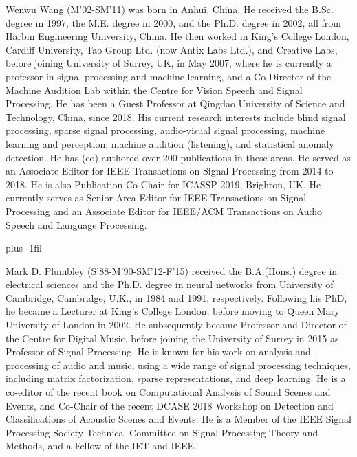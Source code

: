 \documentclass[journal]{IEEEtran}
\begin{document}
\begin{IEEEbiography}{Wenwu Wang} (M'02-SM'11) was born in Anhui, China. He received the B.Sc. degree in 1997, the M.E. degree in 2000, and the Ph.D. degree in 2002, all from Harbin Engineering University, China. He then worked in King's College London, Cardiff University, Tao Group Ltd. (now Antix Labs Ltd.), and Creative Labs, before joining University of Surrey, UK, in May 2007, where he is currently a professor in signal processing and machine learning, and a Co-Director of the Machine Audition Lab within the Centre for Vision Speech and Signal Processing. He has been a Guest Professor at Qingdao University of Science and Technology, China, since 2018. His current research interests include blind signal processing, sparse signal processing, audio-visual signal processing, machine learning and perception, machine audition (listening), and statistical anomaly detection. He has (co)-authored over 200 publications in these areas. He served as an Associate Editor for IEEE Transactions on Signal Processing from 2014 to 2018. He is also Publication Co-Chair for ICASSP 2019, Brighton, UK. He currently serves as Senior Area Editor for IEEE Transactions on Signal Processing and an Associate Editor for IEEE/ACM Transactions on Audio Speech and Language Processing.
\end{IEEEbiography}

\vskip 0pt plus -1fil

\begin{IEEEbiography}{Mark D. Plumbley}
(S'88-M'90-SM'12-F'15) received the B.A.(Hons.) degree in electrical sciences and the Ph.D. degree in neural networks from University of Cambridge, Cambridge, U.K., in 1984 and 1991, respectively. Following his PhD, he became a Lecturer at King's College London, before moving to Queen Mary University of London in 2002. He subsequently became Professor and Director of the Centre for Digital Music, before joining the University of Surrey in 2015 as Professor of Signal Processing. He is known for his work on analysis and processing of audio and music, using a wide range of signal processing techniques, including matrix factorization, sparse representations, and deep learning. He is a co-editor of the recent book on 
Computational Analysis of Sound Scenes and Events,
and Co-Chair of the recent DCASE 2018 Workshop on Detection and Classifications of Acoustic Scenes and Events. He is a Member of the IEEE Signal Processing Society Technical Committee on Signal Processing Theory and Methods, and a Fellow of the IET and IEEE.

\end{IEEEbiography}
\end{document}
